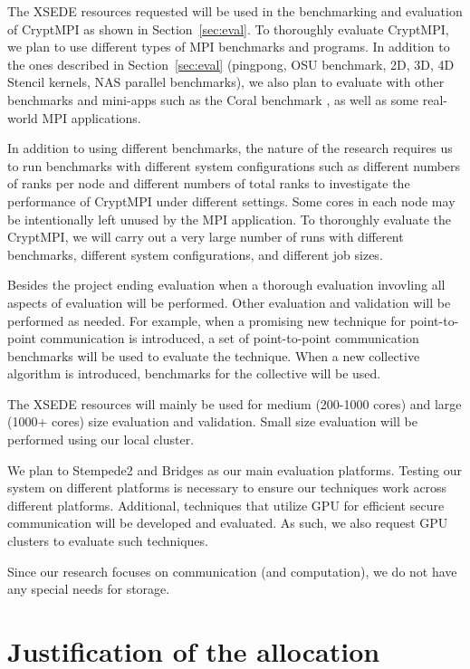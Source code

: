 {The XSEDE resources requested will be used in the benchmarking and evaluation
of CryptMPI as shown in Section~\ref{sec:eval}. To thoroughly evaluate CryptMPI,
we plan to use different types of MPI benchmarks and programs. In addition to the ones
described in Section~\ref{sec:eval} (pingpong, OSU benchmark, 2D, 3D, 4D Stencil kernels,
NAS parallel benchmarks), we also plan to evaluate with other benchmarks and mini-apps
such as the Coral benchmark \cite{CORAL}, as well as some real-world MPI applications. 

In addition to using different benchmarks, the nature of the research requires us to
run benchmarks with different system configurations such as different numbers of ranks per node
and different numbers of total ranks to investigate the performance of CryptMPI under
different settings. Some cores in each node may be intentionally left unused by the MPI
application. To thoroughly evaluate the CryptMPI, we will carry out
a very large number of runs with different benchmarks, different system configurations,
and different job sizes.

Besides the project ending evaluation when a thorough evaluation invovling all aspects
of evaluation will be performed. Other evaluation and validation will be performed as needed.
For example, when a promising new technique for point-to-point communication
is introduced, a set of point-to-point communication benchmarks will be used to evaluate
the technique. When a new collective algorithm is introduced, benchmarks for the
collective will be used.

The XSEDE resources will mainly be used for medium (200-1000 cores)
and large (1000+ cores) size evaluation and validation. Small size evaluation
will be performed using our local cluster. 

We plan to Stempede2 and Bridges as our main evaluation platforms. Testing our system on
different platforms is necessary to ensure our techniques work across different platforms. 
Additional, techniques that utilize GPU for efficient secure communication will be developed
and evaluated. As such, we also request GPU clusters to evaluate such techniques. 

Since our research focuses on communication (and computation), we do not have any special
needs for storage. 

\section{Justification of the allocation}

}
